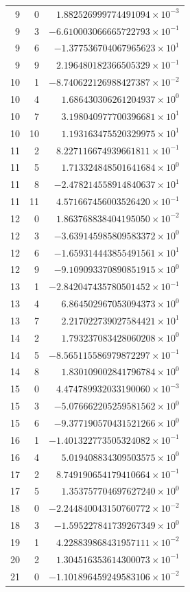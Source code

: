 \begin{longtable}{rrr}
9 & 0 & $1.882526999774491094\times10^{-3}$ \\
9 & 3 & $-6.610003066665722793\times10^{-1}$ \\
9 & 6 & $-1.377536704067965623\times10^{1}$ \\
9 & 9 & $2.196480182366505329\times10^{-1}$ \\
10 & 1 & $-8.740622126988427387\times10^{-2}$ \\
10 & 4 & $1.686430306261204937\times10^{0}$ \\
10 & 7 & $3.198040977700396681\times10^{1}$ \\
10 & 10 & $1.193163475520329975\times10^{1}$ \\
11 & 2 & $8.227116674939661811\times10^{-1}$ \\
11 & 5 & $1.713324848501641684\times10^{0}$ \\
11 & 8 & $-2.478214558914840637\times10^{1}$ \\
11 & 11 & $4.571667456003526420\times10^{-1}$ \\
12 & 0 & $1.863768838404195050\times10^{-2}$ \\
12 & 3 & $-3.639145985809583372\times10^{0}$ \\
12 & 6 & $-1.659314443855491561\times10^{1}$ \\
12 & 9 & $-9.109093370890851915\times10^{0}$ \\
13 & 1 & $-2.842047435780501452\times10^{-1}$ \\
13 & 4 & $6.864502967053094373\times10^{0}$ \\
13 & 7 & $2.217022739027584421\times10^{1}$ \\
14 & 2 & $1.793237083428060208\times10^{0}$ \\
14 & 5 & $-8.565115586979872297\times10^{-1}$ \\
14 & 8 & $1.830109002841796784\times10^{0}$ \\
15 & 0 & $4.474789932033190060\times10^{-3}$ \\
15 & 3 & $-5.076662205259581562\times10^{0}$ \\
15 & 6 & $-9.377190570431521266\times10^{0}$ \\
16 & 1 & $-1.401322773505324082\times10^{-1}$ \\
16 & 4 & $5.019408834309503575\times10^{0}$ \\
17 & 2 & $8.749190654179410664\times10^{-1}$ \\
17 & 5 & $1.353757704697627240\times10^{0}$ \\
18 & 0 & $-2.244840043150760772\times10^{-2}$ \\
18 & 3 & $-1.595227841739267349\times10^{0}$ \\
19 & 1 & $4.228839868431957111\times10^{-2}$ \\
20 & 2 & $1.304516353614300073\times10^{-1}$ \\
21 & 0 & $-1.101896459249583106\times10^{-2}$ \\
\bottomrule
\end{longtable}
\endgroup
